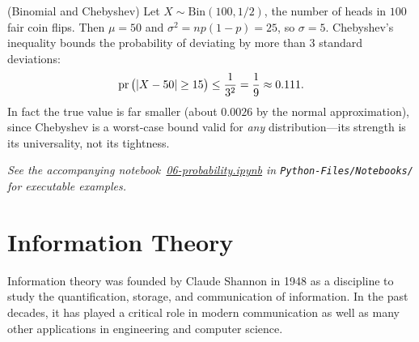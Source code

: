 \documentclass[a4paper, 12pt]{book} %
\newcommand{\notebook}[1]{\begingroup\small\itshape
    See the accompanying notebook~\href{run:./Python-Files/Notebooks/#1}{#1} in \texttt{Python-Files/Notebooks/} for executable examples.%
\endgroup}
\begin{document}
\begin{example}
    (Binomial and Chebyshev) Let $X \sim \mathrm{Bin}(100, 1/2)$, the number of heads in $100$ fair coin flips. Then $\mu = 50$ and $\sigma^2 = np(1-p) = 25$, so $\sigma = 5$. Chebyshev's inequality bounds the probability of deviating by more than $3$ standard deviations:
    \begin{align}
        \operatorname{pr}\big(|X - 50| \geq 15\big) \leq \frac{1}{3^2} = \frac19 \approx 0.111.
    \end{align}
    In fact the true value is far smaller (about $0.0026$ by the normal approximation), since Chebyshev is a worst-case bound valid for \emph{any} distribution---its strength is its universality, not its tightness.
\end{example}

\notebook{06-probability.ipynb}

\chapter{Information Theory}
\label{ch:infotheory}
Information theory was founded by Claude Shannon in 1948 as a discipline to study the quantification, storage, and communication of information. In the past decades, it has played a critical role in modern communication as well as many other applications in engineering and computer science.  
\end{document}
